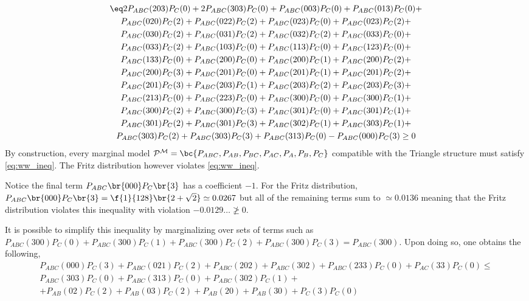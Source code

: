 \documentclass[aps, 10pt, english, twoside, pra, nofootinbib, tightenlines, longbibliography, superscriptaddress]{revtex4-1}
\begin{document}
    \begin{equation*}
    \begin{gathered}
    \eq\label{eq:ww_ineq}
    2P_{ABC}(203)P_{C}(0) + 2P_{ABC}(303)P_{C}(0) + P_{ABC}(003)P_{C}(0) + P_{ABC}(013)P_{C}(0) + \\
    P_{ABC}(020)P_{C}(2) + P_{ABC}(022)P_{C}(2) + P_{ABC}(023)P_{C}(0) + P_{ABC}(023)P_{C}(2) + \\
    P_{ABC}(030)P_{C}(2) + P_{ABC}(031)P_{C}(2) + P_{ABC}(032)P_{C}(2) + P_{ABC}(033)P_{C}(0) + \\
    P_{ABC}(033)P_{C}(2) + P_{ABC}(103)P_{C}(0) + P_{ABC}(113)P_{C}(0) + P_{ABC}(123)P_{C}(0) + \\
    P_{ABC}(133)P_{C}(0) + P_{ABC}(200)P_{C}(0) + P_{ABC}(200)P_{C}(1) + P_{ABC}(200)P_{C}(2) + \\
    P_{ABC}(200)P_{C}(3) + P_{ABC}(201)P_{C}(0) + P_{ABC}(201)P_{C}(1) + P_{ABC}(201)P_{C}(2) + \\
    P_{ABC}(201)P_{C}(3) + P_{ABC}(203)P_{C}(1) + P_{ABC}(203)P_{C}(2) + P_{ABC}(203)P_{C}(3) + \\
    P_{ABC}(213)P_{C}(0) + P_{ABC}(223)P_{C}(0) + P_{ABC}(300)P_{C}(0) + P_{ABC}(300)P_{C}(1) + \\
    P_{ABC}(300)P_{C}(2) + P_{ABC}(300)P_{C}(3) + P_{ABC}(301)P_{C}(0) + P_{ABC}(301)P_{C}(1) + \\
    P_{ABC}(301)P_{C}(2) + P_{ABC}(301)P_{C}(3) + P_{ABC}(302)P_{C}(1) + P_{ABC}(303)P_{C}(1) + \\
    P_{ABC}(303)P_{C}(2) + P_{ABC}(303)P_{C}(3) + P_{ABC}(313)P_{C}(0) - P_{ABC}(000)P_{C}(3) \geq 0
    \end{gathered}
    \end{equation*}
    By construction, every marginal model $\probvec^{\mscenario} = \bc{\prob[ABC], \prob[AB], \prob[BC], \prob[AC], \prob[A], \prob[B], \prob[C]}$ compatible with the Triangle structure must satisfy \cref{eq:ww_ineq}. The Fritz distribution however violates \cref{eq:ww_ineq}.

    Notice the final term $\prob[ABC]\br{000}\prob[C]\br{3}$ has a coefficient $-1$. For the Fritz distribution, $\prob[ABC]\br{000}\prob[C]\br{3} = \f{1}{128}\br{2 + \sqrt{2}} \simeq 0.0267$ but all of the remaining terms sum to $\simeq 0.0136$ meaning that the Fritz distribution violates this inequality with violation $-0.0129\ldots \not \geq 0$.


    It is possible to simplify this inequality by marginalizing over sets of terms such as $P_{ABC}(300)P_{C}(0) + P_{ABC}(300)P_{C}(1) + P_{ABC}(300)P_{C}(2) + P_{ABC}(300)P_{C}(3) = P_{ABC}(300)$. Upon doing so, one obtains the following,
    \begin{gather*}
        P_{ABC}(000)P_{C}(3) + P_{ABC}(021)P_{C}(2) + P_{ABC}(202) + P_{ABC}(302) + P_{ABC}(233)P_{C}(0) + P_{AC}(33)P_{C}(0) \leq \\ P_{ABC}(303)P_{C}(0) + P_{ABC}(313)P_{C}(0) + P_{ABC}(302)P_{C}(1) + \\
        + P_{AB}(02)P_{C}(2) + P_{AB}(03)P_{C}(2) + P_{AB}(20) + P_{AB}(30) + P_{C}(3)P_{C}(0)
    \end{gather*}
\end{document}
